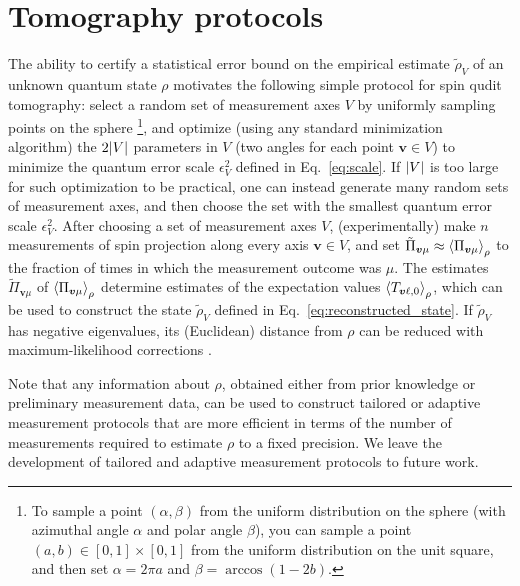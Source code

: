 \documentclass[notitlepage,twocolumn]{revtex4-2}
\newcommand{\p}[1]{\left(#1\right)} %
\newcommand{\bk}{\Braket} %
\renewcommand{\v}{\bm} %
\begin{document}
\section{Tomography protocols}
\label{sec:protocol}

The ability to certify a statistical error bound on the empirical estimate $\tilde\rho_V$ of an unknown quantum state $\rho$ motivates the following simple protocol for spin qudit tomography: select a random set of measurement axes $V$ by uniformly sampling points on the sphere \footnote{To sample a point $\p{\alpha,\beta}$ from the uniform distribution on the sphere (with azimuthal angle $\alpha$ and polar angle $\beta$), you can sample a point $\p{a,b}\in[0,1]\times[0,1]$ from the uniform distribution on the unit square, and then set $\alpha=2\pi a$ and $\beta=\arccos\p{1-2b}$.}, and optimize (using any standard minimization algorithm) the $2\abs{V}$ parameters in $V$ (two angles for each point $\v v\in V$) to minimize the quantum error scale $\epsilon_V^2$ defined in Eq.~\eqref{eq:scale}.
If $\abs{V}$ is too large for such optimization  to be practical, one can instead generate many random sets of measurement axes, and then choose the set with the smallest quantum error scale $\epsilon_V^2$.
After choosing a set of measurement axes $V$, (experimentally) make $n$ measurements of spin projection along every axis $\v v\in V$, and set $\tilde\Pi_{\v v\mu}\approx\bk{\Pi_{\v v\mu}}_\rho$ to the fraction of times in which the measurement outcome was $\mu$.
The estimates $\tilde\Pi_{\v v\mu}$ of $\bk{\Pi_{\v v\mu}}_\rho$ determine estimates of the expectation values $\bk{T_{\v v\ell,0}}_\rho$, which can be used to construct the state $\tilde\rho_V$ defined in Eq.~\eqref{eq:reconstructed_state}.
If $\tilde\rho_V$ has negative eigenvalues, its (Euclidean) distance from $\rho$ can be reduced with maximum-likelihood corrections \cite{smolin2012efficient}.

Note that any information about $\rho$, obtained either from prior knowledge or preliminary measurement data, can be used to construct tailored or adaptive measurement protocols \cite{pereira2018adaptive} that are more efficient in terms of the number of measurements required to estimate $\rho$ to a fixed precision.
We leave the development of tailored and adaptive measurement protocols to future work.
\end{document}
